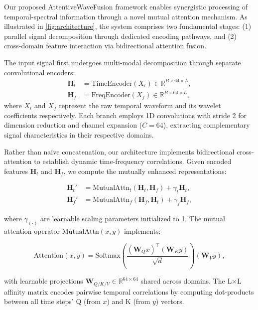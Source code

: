 \documentclass[10pt,twocolumn]{article}
\begin{document}
Our proposed AttentiveWaveFusion framework enables synergistic processing of temporal-spectral information through a novel mutual attention mechanism. As illustrated in \autoref{fig:architecture}, the system comprises two fundamental stages: (1) parallel signal decomposition through dedicated encoding pathways, and (2) cross-domain feature interaction via bidirectional attention fusion.


The input signal first undergoes multi-modal decomposition through separate convolutional encoders:
\begin{equation}
    \begin{aligned}
        \mathbf{H}_t & = \text{TimeEncoder}(X_t) \in \mathbb{R}^{B \times 64 \times L}, \\
        \mathbf{H}_f & = \text{FreqEncoder}(X_f) \in \mathbb{R}^{B \times 64 \times L},
    \end{aligned}
\end{equation}
where $X_t$ and $X_f$ represent the raw temporal waveform and its wavelet coefficients respectively. Each branch employs 1D convolutions with stride 2 for dimension reduction and channel expansion ($C=64$), extracting complementary signal characteristics in their respective domains.


Rather than naive concatenation, our architecture implements bidirectional cross-attention to establish dynamic time-frequency correlations. Given encoded features $\mathbf{H}_t$ and $\mathbf{H}_f$, we compute the mutually enhanced representations:

\begin{equation}
    \begin{aligned}
        \mathbf{H}_t' & = \text{MutualAttn}_t(\mathbf{H}_t, \mathbf{H}_f) + \gamma_t \mathbf{H}_t, \\
        \mathbf{H}_f' & = \text{MutualAttn}_f(\mathbf{H}_f, \mathbf{H}_t) + \gamma_f \mathbf{H}_f,
    \end{aligned}
\end{equation}

where $\gamma_{(\cdot)}$ are learnable scaling parameters initialized to 1. The mutual attention operator $\text{MutualAttn}(x,y)$ implements:

\begin{equation}
    \text{Attention}(x,y) = \text{Softmax}\left(\frac{(\mathbf{W}_Q x)^\top (\mathbf{W}_K y)}{\sqrt{d}}\right)(\mathbf{W}_V y),
\end{equation}

\noindent with learnable projections $\mathbf{W}_{Q/K/V} \in \mathbb{R}^{64 \times 64}$ shared across domains. The L×L affinity matrix encodes pairwise temporal correlations by computing dot-products between all time steps' Q (from $x$) and K (from $y$) vectors.
\end{document}
